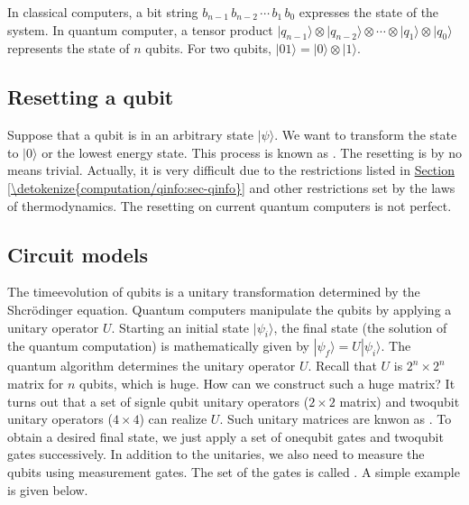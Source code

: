 \documentclass[letterpaper,10pt,english]{jupyterBook}
\begin{document}
\sphinxAtStartPar
In classical computers,  a bit string \(b_{n-1}\, b_{n-2}\,\cdots\, b_1\, b_0\) expresses the state of the system.  In quantum computer, a tensor product \(\lvert q_{n-1} \rangle \otimes \lvert q_{n-2}\rangle \otimes \cdots \otimes \lvert q_1 \rangle \otimes \lvert q_0 \rangle\) represents the state of \(n\) qubits.  For two qubits, \(\lvert 01 \rangle = \lvert 0 \rangle \otimes \lvert 1 \rangle\).


\subsection{Resetting a qubit}
\label{\detokenize{computation/qcomp:resetting-a-qubit}}
\sphinxAtStartPar
Suppose that a qubit is in an arbitrary state \(|\psi\rangle\).  We want to transform the state to \(|0\rangle\) or the lowest energy state.  This process is known as .  The resetting is by no means trivial.  Actually, it is very difficult due to the restrictions listed in \hyperref[\detokenize{computation/qinfo:sec-qinfo}]{Section \ref{\detokenize{computation/qinfo:sec-qinfo}}} and other restrictions set by the laws of thermodynamics.  The resetting on current quantum computers is not perfect.


\subsection{Circuit models}
\label{\detokenize{computation/qcomp:circuit-models}}
\sphinxAtStartPar
The time\sphinxhyphen{}evolution of qubits  is a unitary transformation determined by the Shcrödinger equation.  Quantum computers manipulate the qubits by applying a unitary operator \(U\).  Starting an initial state \(|\psi_i\rangle\), the final state (the solution of the quantum computation) is mathematically given by \(|\psi_f\rangle = U |\psi_i\rangle\).  The quantum algorithm determines the unitary operator \(U\). Recall that \(U\) is \(2^n \times 2^n\) matrix for \(n\) qubits, which is huge.   How can we construct such a huge matrix?  It turns out that a set of signle qubit unitary operators (\(2\times 2\) matrix) and two\sphinxhyphen{}qubit unitary operators (\(4 \times 4\)) can realize \(U\).  Such unitary matrices are knwon as .  To obtain a desired final state, we just apply a set of one\sphinxhyphen{}qubit gates and two\sphinxhyphen{}qubit gates successively.  In addition to the unitaries, we also need to measure the qubits using measurement gates.  The set of the gates is called .  A simple example is given below.
\end{document}
